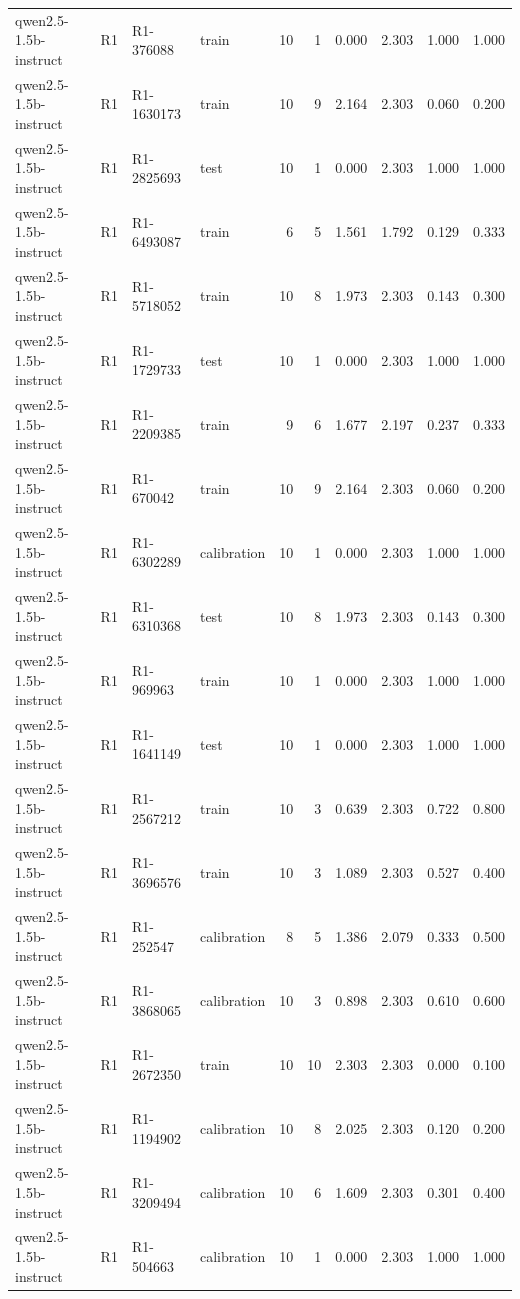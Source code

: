 \begin{table}
\begin{tabular}{llllrrrrrr}
qwen2.5-1.5b-instruct & R1 & R1-376088 & train & 10 & 1 & 0.000 & 2.303 & 1.000 & 1.000 \\
qwen2.5-1.5b-instruct & R1 & R1-1630173 & train & 10 & 9 & 2.164 & 2.303 & 0.060 & 0.200 \\
qwen2.5-1.5b-instruct & R1 & R1-2825693 & test & 10 & 1 & 0.000 & 2.303 & 1.000 & 1.000 \\
qwen2.5-1.5b-instruct & R1 & R1-6493087 & train & 6 & 5 & 1.561 & 1.792 & 0.129 & 0.333 \\
qwen2.5-1.5b-instruct & R1 & R1-5718052 & train & 10 & 8 & 1.973 & 2.303 & 0.143 & 0.300 \\
qwen2.5-1.5b-instruct & R1 & R1-1729733 & test & 10 & 1 & 0.000 & 2.303 & 1.000 & 1.000 \\
qwen2.5-1.5b-instruct & R1 & R1-2209385 & train & 9 & 6 & 1.677 & 2.197 & 0.237 & 0.333 \\
qwen2.5-1.5b-instruct & R1 & R1-670042 & train & 10 & 9 & 2.164 & 2.303 & 0.060 & 0.200 \\
qwen2.5-1.5b-instruct & R1 & R1-6302289 & calibration & 10 & 1 & 0.000 & 2.303 & 1.000 & 1.000 \\
qwen2.5-1.5b-instruct & R1 & R1-6310368 & test & 10 & 8 & 1.973 & 2.303 & 0.143 & 0.300 \\
qwen2.5-1.5b-instruct & R1 & R1-969963 & train & 10 & 1 & 0.000 & 2.303 & 1.000 & 1.000 \\
qwen2.5-1.5b-instruct & R1 & R1-1641149 & test & 10 & 1 & 0.000 & 2.303 & 1.000 & 1.000 \\
qwen2.5-1.5b-instruct & R1 & R1-2567212 & train & 10 & 3 & 0.639 & 2.303 & 0.722 & 0.800 \\
qwen2.5-1.5b-instruct & R1 & R1-3696576 & train & 10 & 3 & 1.089 & 2.303 & 0.527 & 0.400 \\
qwen2.5-1.5b-instruct & R1 & R1-252547 & calibration & 8 & 5 & 1.386 & 2.079 & 0.333 & 0.500 \\
qwen2.5-1.5b-instruct & R1 & R1-3868065 & calibration & 10 & 3 & 0.898 & 2.303 & 0.610 & 0.600 \\
qwen2.5-1.5b-instruct & R1 & R1-2672350 & train & 10 & 10 & 2.303 & 2.303 & 0.000 & 0.100 \\
qwen2.5-1.5b-instruct & R1 & R1-1194902 & calibration & 10 & 8 & 2.025 & 2.303 & 0.120 & 0.200 \\
qwen2.5-1.5b-instruct & R1 & R1-3209494 & calibration & 10 & 6 & 1.609 & 2.303 & 0.301 & 0.400 \\
qwen2.5-1.5b-instruct & R1 & R1-504663 & calibration & 10 & 1 & 0.000 & 2.303 & 1.000 & 1.000 \\

\end{tabular}
\end{table}
